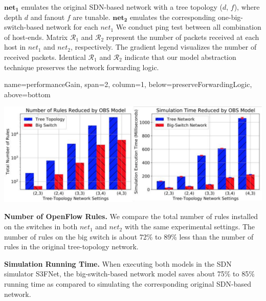 \documentclass[a0paper,portrait]{baposter}
\begin{document}
\begin{poster}
{$\mathbf{net_1}$ emulates the original SDN-based network with a tree topology ($d$, $f$),
where depth $d$ and fanout $f$ are tunable.
$\mathbf{net_2}$ emulates the corresponding one-big-switch-based network for each $net_1$
We conduct ping test between all combination of host-ends.
Matrix $\mathcal{R}_1$ and $\mathcal{R}_2$ represent the number of packets received at each host
in $net_1$ and $net_2$, respectively.
The gradient legend visualizes the number of received packets.
Identical $\mathcal{R}_1$ and $\mathcal{R}_2$ indicate that our model abstraction technique
preserves the network forwarding logic.
}

{name=performanceGain, span=2, column=1, below=preserveForwardingLogic, above=bottom}{

\begin{center}
	\includegraphics[angle=0,width=0.88\linewidth]{comp_both_rule_time}
\end{center}

\textbf{Number of OpenFlow Rules.} We compare the total number of rules installed
on the switches in both $net_1$ and $net_2$ with the same experimental settings.
The number of rules on the big switch is about 72\% to 89\% less than
the number of rules in the original tree-topology network.

\textbf{Simulation Running Time.}
When executing both models in the SDN simulator S3FNet,
the big-switch-based network model saves about 75\% to 85\% running time
as compared to simulating the corresponding original SDN-based network.

}
\end{poster}
\end{document}

